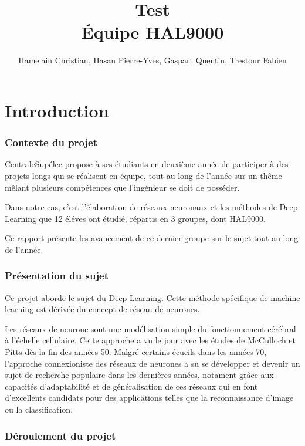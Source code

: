 \documentclass[a4paper,twoside]{report}
\title{Test\\Équipe HAL9000}
\author{Hamelain Christian, Hasan Pierre-Yves, Gaspart Quentin, Trestour Fabien}
\begin{document}
	\maketitle


	\tableofcontents


	\part{Introduction}

		\section[Contexte]{Contexte du projet}

			CentraleSupélec propose à ses étudiants en deuxième année de participer à des projets longs qui se réalisent en équipe, tout au long de l'année sur un thême mêlant plusieurs compétences que l'ingénieur se doit de posséder.

			Dans notre cas, c'est l'élaboration de réseaux neuronaux et les méthodes de Deep Learning que 12 éléves ont étudié, répartis en 3 groupes, dont HAL9000.

			Ce rapport présente les avancement de ce dernier groupe sur le sujet tout au long de l'année.


		\section{Présentation du sujet}

			Ce projet aborde le sujet du Deep Learning. Cette méthode spécifique de machine learning est dérivée du concept de réseau de neurones.

			Les réseaux de neurone sont une modélisation simple du fonctionnement cérébral à l'échelle cellulaire. Cette approche a vu le jour avec les études de McCulloch et Pitts dès la fin des années 50. Malgré certains écueils dans les années 70, l'approche connexioniste des réseaux de neurones a su se développer et devenir un sujet de recherche populaire dans les dernières années, notament grâce aux capacités d'adaptabilité et de généralisation de ces réseaux qui en font d'excellents candidats pour des applications telles que la reconnaissance d'image ou la classification.


		\section[Déroulement]{Déroulement du projet}
\end{document}
